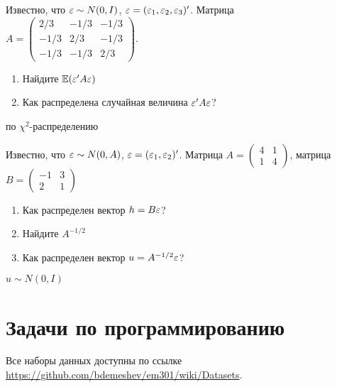 \documentclass[pdftex,11pt,openany]{book}\usepackage[]{graphicx}\usepackage[]{color}
\begin{document}
\begin{solution}
\end{solution}


\begin{problem}
Известно, что $\varepsilon\sim N(0,I)$, $\varepsilon=(\varepsilon_1,\varepsilon_2,\varepsilon_3)'$. Матрица $A=\left(\begin{matrix}
2/3 & -1/3 & -1/3 \\ 
-1/3 & 2/3 & -1/3 \\ 
-1/3 & -1/3 & 2/3
\end{matrix}\right)$.
\begin{enumerate}
\item Найдите $\mathbb{E}(\varepsilon'A\varepsilon)$
\item Как распределена случайная величина $\varepsilon' A\varepsilon$?
\end{enumerate}
\end{problem}

\begin{solution}
по $\chi^2$-распределению 
\end{solution}


\begin{problem}
Известно, что $\varepsilon\sim N(0,A)$, $\varepsilon=(\varepsilon_1,\varepsilon_2)'$. Матрица $A=\left(\begin{matrix}
4 & 1 \\ 
1 & 4 
\end{matrix}\right)$, матрица $B=\left(\begin{matrix}
-1 & 3 \\ 
2 & 1 
\end{matrix}\right)$
\begin{enumerate}
\item Как распределен вектор $h=B\varepsilon$?
\item Найдите $A^{-1/2}$
\item Как распределен вектор $u=A^{-1/2}\varepsilon$?
\end{enumerate}
\end{problem}

\begin{solution}
$u\sim N(0,I)$ 
\end{solution}


\chapter{Задачи по программированию}

\begin{problemtext}
Все наборы данных доступны по ссылке \url{https://github.com/bdemeshev/em301/wiki/Datasets}.
\end{problemtext}
\end{document}
